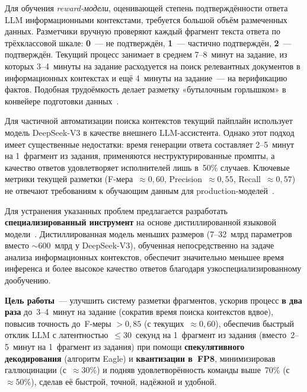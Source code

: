 \documentclass[times]{itmo-student-thesis}
\begin{document}
Для обучения \emph{reward-модели}, оценивающей степень подтверждённости
ответа LLM информационными контекстами, требуется большой объём размеченных
данных. Разметчики вручную проверяют каждый фрагмент текста ответа по
трёхклассовой шкале: \textbf{0}~--- не подтверждён, \textbf{1}~---
частично подтверждён, \textbf{2}~--- подтверждён. Текущий процесс занимает
в среднем 7–8~минут на задание, из которых 3–4~минуты на задание расходуется
на поиск релевантных документов в информационных контекстах и ещё 4~минуты на задание~---
на верификацию фактов. Подобная трудоёмкость делает разметку «бутылочным
горлышком» в конвейере подготовки данных~\cite{silicon-annotation}.

Для частичной автоматизации поиска контекстов текущий пайплайн использует
модель DeepSeek-V3 в качестве внешнего LLM-ассистента. Однако этот подход
имеет существенные недостатки: время генерации ответа составляет 2–5~минут
на 1~фрагмент из задания,
применяются неструктурированные промпты, а качество ответов удовлетворяет
исполнителей лишь в~50\% случаев. Ключевые метрики текущей разметки
(F-мера~$\approx 0{,}60$, Precision~$\approx 0{,}55$, Recall~$\approx 0{,}57$)
не отвечают требованиям к обучающим данным для production-моделей~\cite{automated-annotation-validation}.

Для устранения указанных проблем предлагается разработать
\textbf{специализированный инструмент} на основе дистиллированной языковой
модели~\cite{hinton2015distilling}. Дистиллированная модель меньших размеров
(7–32~млрд параметров вместо $\sim600$~млрд у DeepSeek-V3), обученная
непосредственно на задаче анализа информационных контекстов, обеспечит
значительно меньшее время инференса и более высокое качество ответов
благодаря узкоспециализированному дообучению.

\textbf{Цель работы}~--- улучшить систему разметки фрагментов, ускорив процесс
\textbf{в два раза} до~3--4~минут на задание (сократив время поиска контекстов
вдвое), повысив точность до~F-меры $> 0{,}85$ (с текущих~$\approx 0{,}60$),
обеспечив быстрый отклик LLM с латентностью~$\le 30$~секунд на 1~фрагмент
из задания (вместо~2--5~минут на 1~фрагмент из задания)
при помощи \textbf{спекулятивного декодирования} (алгоритм Eagle) и
\textbf{квантизации в~FP8}, минимизировав галлюцинации (с~$\approx 30$\%) и
подняв удовлетворённость команды выше~70\% (с~$\approx 50$\%), сделав её
быстрой, точной, надёжной и удобной.
\end{document}
